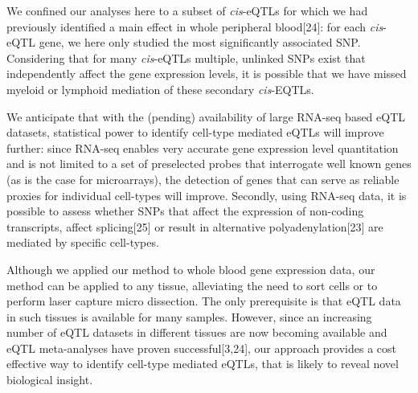   We confined our analyses here to a subset of \emph{cis}-eQTLs for which we had previously identified a main 
  effect in whole peripheral blood[24]: for each \emph{cis}-eQTL gene, we here only studied the most 
  significantly associated SNP. Considering that for many \emph{cis}-eQTLs multiple, unlinked SNPs exist that 
  independently affect the gene expression levels, it is possible that we have missed myeloid or 
  lymphoid mediation of these secondary \emph{cis}-EQTLs.

  We anticipate that with the (pending) availability of large RNA-seq based eQTL datasets, statistical 
  power to identify cell-type mediated eQTLs will improve further: since RNA-seq enables very accurate 
  gene expression level quantitation and is not limited to a set of preselected probes that interrogate 
  well known genes (as is the case for microarrays), the detection of genes that can serve as reliable 
  proxies for individual cell-types will improve. Secondly, using RNA-seq data, it is possible to 
  assess whether SNPs that affect the expression of non-coding transcripts, affect splicing[25] or result 
  in alternative polyadenylation[23] are mediated by specific cell-types.

  Although we applied our method to whole blood gene expression data, our method can be applied to any 
  tissue, alleviating the need to sort cells or to perform laser capture micro dissection. The only 
  prerequisite is that eQTL data in such tissues is available for many samples. However, since an 
  increasing number of eQTL datasets in different tissues are now becoming available and eQTL meta-analyses 
  have proven successful[3,24], our approach provides a cost effective way to identify cell-type 
  mediated eQTLs, that is likely to reveal novel biological insight.

